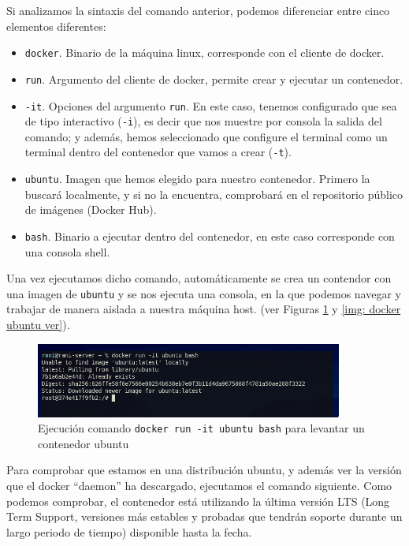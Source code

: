 \documentclass[12pt]{article}
\begin{document}
	\noindent Si analizamos la sintaxis del comando anterior, podemos diferenciar entre cinco elementos diferentes:
	\begin{itemize}
		\item \texttt{docker}. Binario de la máquina linux, corresponde con el cliente de docker.
		\item \texttt{run}. Argumento del cliente de docker, permite crear y ejecutar un contenedor.
		\item \texttt{-it}. Opciones del argumento \texttt{run}. En este caso, tenemos configurado que sea de tipo interactivo (\texttt{-i}), es decir que nos muestre por consola la salida del comando; y además, hemos seleccionado que configure el terminal como un terminal dentro del contenedor que vamos a crear (\texttt{-t}).
		\item \texttt{ubuntu}. Imagen que hemos elegido para nuestro contenedor. Primero la buscará localmente, y si no la encuentra, comprobará en el repositorio público de imágenes (Docker Hub).
		\item \texttt{bash}. Binario a ejecutar dentro del contenedor, en este caso corresponde con una consola shell.
	\end{itemize}

	\noindent Una vez ejecutamos dicho comando, automáticamente se crea un contendor con una imagen de \texttt{ubuntu} y se nos ejecuta una consola, en la que podemos navegar y trabajar de manera aislada a nuestra máquina host. (ver Figuras \ref{img: docker ubuntu} y \ref{img: docker ubuntu ver}).
	
	\pagebreak
	
	\begin{figure}[h]
		\begin{center}
			\includegraphics[width=0.9\textwidth]{img/docker_ubuntu.png}
			\caption{Ejecución comando \texttt{docker run -it ubuntu bash} para levantar un contenedor ubuntu}
			\label{img: docker ubuntu}
		\end{center}
	\end{figure}


	\noindent Para comprobar que estamos en una distribución ubuntu, y además ver la versión que el docker ``daemon'' ha descargado, ejecutamos el comando siguiente. Como podemos comprobar, el contenedor está utilizando la última versión LTS (Long Term Support, versiones más estables y probadas que tendrán soporte durante un largo periodo de tiempo) disponible hasta la fecha.
	
\end{document}
